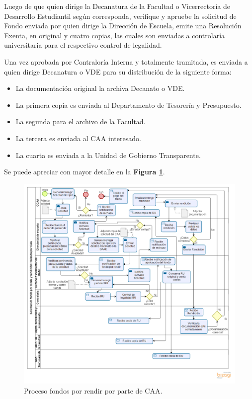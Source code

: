 \begin{tasks}[counter-format = {tsk[A].}]
    Luego de que quien dirige la Decanatura de la Facultad o Vicerrectoría de Desarrollo Estudiantil según corresponda, verifique y apruebe la solicitud de Fondo enviada por quien dirige la Dirección de Escuela, emite una Resolución Exenta, en original y cuatro copias, las cuales son enviadas a controlaría universitaria para el respectivo control de legalidad.

    Una vez aprobada por Contraloría Interna y totalmente tramitada, es enviada a quien dirige Decanatura o VDE para su distribución de la siguiente forma: 
    \begin{itemize}
        \item La documentación original la archiva Decanato o VDE.
        \item La primera copia es enviada al Departamento de Tesorería y Presupuesto.
        \item La segunda para el archivo de la Facultad.
        \item La tercera es enviada al CAA interesado.
        \item La cuarta es enviada a la Unidad de Gobierno Transparente.
    \end{itemize}

    Se puede apreciar con mayor detalle en la \textbf{Figura \ref{fig: Solicitud_CAA}}.

\end{tasks}

\begin{figure}[tb!]
    \centering
    \includegraphics[width=\textwidth]{Imagenes/Solicitud_CCAA.png}
    \caption{\label{fig: Solicitud_CAA}Proceso fondos por rendir por parte de CAA.}
\end{figure}

